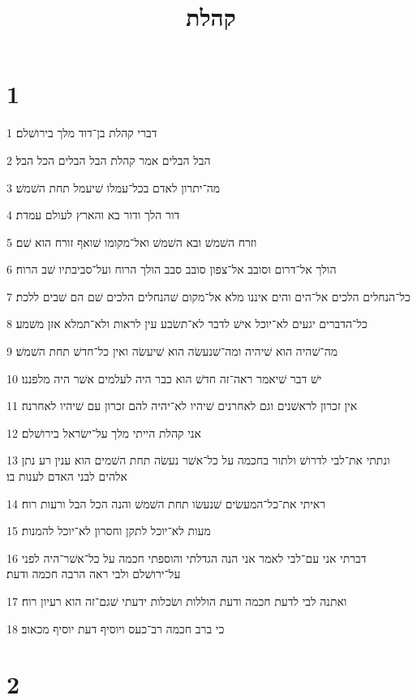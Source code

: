 

\title{קהלת}


\chapter{1}

\par 1 דברי קהלת בן־דוד מלך בירושׁלם׃
\par 2 הבל הבלים אמר קהלת הבל הבלים הכל הבל׃
\par 3 מה־יתרון לאדם בכל־עמלו שׁיעמל תחת השׁמשׁ׃
\par 4 דור הלך ודור בא והארץ לעולם עמדת׃
\par 5 וזרח השׁמשׁ ובא השׁמשׁ ואל־מקומו שׁואף זורח הוא שׁם׃
\par 6 הולך אל־דרום וסובב אל־צפון סובב סבב הולך הרוח ועל־סביבתיו שׁב הרוח׃
\par 7 כל־הנחלים הלכים אל־הים והים איננו מלא אל־מקום שׁהנחלים הלכים שׁם הם שׁבים ללכת׃
\par 8 כל־הדברים יגעים לא־יוכל אישׁ לדבר לא־תשׂבע עין לראות ולא־תמלא אזן משׁמע׃
\par 9 מה־שׁהיה הוא שׁיהיה ומה־שׁנעשׂה הוא שׁיעשׂה ואין כל־חדשׁ תחת השׁמשׁ׃
\par 10 ישׁ דבר שׁיאמר ראה־זה חדשׁ הוא כבר היה לעלמים אשׁר היה מלפננו׃
\par 11 אין זכרון לראשׁנים וגם לאחרנים שׁיהיו לא־יהיה להם זכרון עם שׁיהיו לאחרנה׃
\par 12 אני קהלת הייתי מלך על־ישׂראל בירושׁלם׃
\par 13 ונתתי את־לבי לדרושׁ ולתור בחכמה על כל־אשׁר נעשׂה תחת השׁמים הוא ענין רע נתן אלהים לבני האדם לענות בו׃
\par 14 ראיתי את־כל־המעשׂים שׁנעשׂו תחת השׁמשׁ והנה הכל הבל ורעות רוח׃
\par 15 מעות לא־יוכל לתקן וחסרון לא־יוכל להמנות׃
\par 16 דברתי אני עם־לבי לאמר אני הנה הגדלתי והוספתי חכמה על כל־אשׁר־היה לפני על־ירושׁלם ולבי ראה הרבה חכמה ודעת׃
\par 17 ואתנה לבי לדעת חכמה ודעת הוללות ושׂכלות ידעתי שׁגם־זה הוא רעיון רוח׃
\par 18 כי ברב חכמה רב־כעס ויוסיף דעת יוסיף מכאוב׃

\chapter{2}

